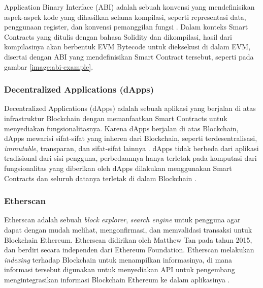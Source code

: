 Application Binary Interface (ABI) adalah sebuah konvensi yang mendefinisikan aspek-aspek kode yang dihasilkan selama kompilasi, seperti representasi data, penggunaan register, dan konvensi pemanggilan fungsi \parencite{sciencedirect2024}. Dalam konteks Smart Contracts yang ditulis dengan bahasa Solidity dan dikompilasi, hasil dari kompilasinya akan berbentuk EVM Bytecode untuk dieksekusi di dalam EVM, disertai dengan ABI yang mendefinisikan Smart Contract tersebut, seperti pada gambar \ref{image:abi-example}.

\subsubsection{Decentralized Applications (dApps)}
\label{subsubsec:dapps}

Decentralized Applications (dApps) adalah sebuah aplikasi yang berjalan di atas infrastruktur Blockchain dengan memanfaatkan Smart Contracts untuk menyediakan fungsionalitasnya. Karena dApps berjalan di atas Blockchain, dApps mewarisi sifat-sifat yang inheren dari Blockchain, seperti terdesentralisasi, \textit{immutable}, transparan, dan sifat-sifat lainnya \parencite{investopedia2024}. dApps tidak berbeda dari aplikasi tradisional dari sisi pengguna, perbedaannya hanya terletak pada komputasi dari fungsionalitas yang diberikan oleh dApps dilakukan menggunakan Smart Contracts dan seluruh datanya terletak di dalam Blockchain \parencite{metcalfe2020ethereum}. 

\subsubsection{Etherscan}
\label{subsubsec:etherscan}

Etherscan adalah sebuah \textit{block explorer}, \textit{search engine} untuk pengguna agar dapat dengan mudah melihat, mengonfirmasi, dan memvalidasi transaksi untuk Blockchain Ethereum. Etherscan didirikan oleh Matthew Tan pada tahun 2015, dan berdiri secara independen dari Ethereum Foundation. Etherscan melakukan \textit{indexing} terhadap Blockchain untuk menampilkan informasinya, di mana informasi tersebut digunakan untuk menyediakan API untuk pengembang mengintegrasikan informasi Blockchain Ethereum ke dalam aplikasinya \parencite{etherscan2024}.